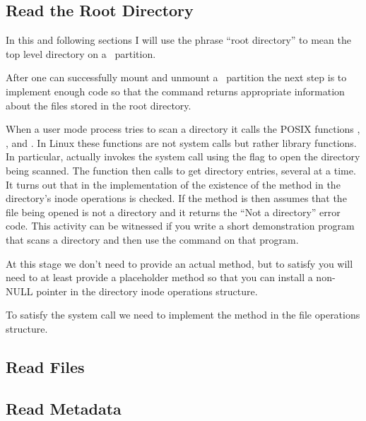 \subsection{Read the Root Directory}
\label{sec:implementation-readroot}

In this and following sections I will use the phrase ``root directory'' to mean the top level
directory on a \GenericFS\ partition.

After one can successfully mount and unmount a \GenericFS\ partition the next step is to
implement enough code so that the command  returns appropriate information about
the files stored in the root directory.

When a user mode process tries to scan a directory it calls the POSIX functions ,
, and . In Linux these functions are not system calls but rather
library functions. In particular,  actually invokes the  system call
using the  flag to open the directory being scanned. The 
function then calls  to get directory entries, several at a time. It turns out
that in the implementation of  the existence of the  method in the
directory's inode operations is checked. If the method is  then  assumes
that the file being opened is not a directory and it returns the ``Not a directory'' error code.
This activity can be witnessed if you write a short demonstration program that scans a directory
and then use the  command on that program.

At this stage we don't need to provide an actual  method, but to satisfy
 you will need to at least provide a placeholder method so that you can install a
non-NULL pointer in the directory inode operations structure.

To satisfy the  system call we need to implement the  method in the
file operations structure.

\subsection{Read Files}
\label{sec-implementation-readfiles}

\subsection{Read Metadata}
\label{sec-implementation-readmeta}

